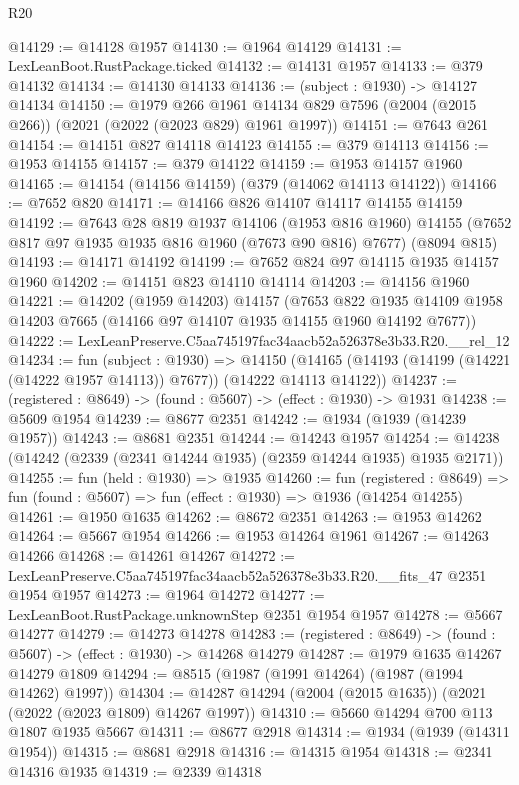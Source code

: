 \begin{lexlean}{R20}
\begin{coremodule}
@14129 := @14128 @1957
@14130 := @1964 @14129
@14131 := LexLeanBoot.RustPackage.ticked
@14132 := @14131 @1957
@14133 := @379 @14132
@14134 := @14130 @14133
@14136 := (subject : @1930) -> @14127 @14134
@14150 := @1979
    @266
    @1961
    @14134
    @829
    @7596
    (@2004 (@2015 @266))
    (@2021 (@2022 (@2023 @829) @1961 @1997))
@14151 := @7643 @261
@14154 := @14151 @827 @14118 @14123
@14155 := @379 @14113
@14156 := @1953 @14155
@14157 := @379 @14122
@14159 := @1953 @14157 @1960
@14165 := @14154 (@14156 @14159) (@379 (@14062 @14113 @14122))
@14166 := @7652 @820
@14171 := @14166 @826 @14107 @14117 @14155 @14159
@14192 := @7643
    @28
    @819
    @1937
    @14106
    (@1953 @816 @1960)
    @14155
    (@7652 @817 @97 @1935 @1935 @816 @1960 (@7673 @90 @816) @7677)
    (@8094 @815)
@14193 := @14171 @14192
@14199 := @7652 @824 @97 @14115 @1935 @14157 @1960
@14202 := @14151 @823 @14110 @14114
@14203 := @14156 @1960
@14221 := @14202
    (@1959 @14203)
    @14157
    (@7653 @822 @1935 @14109 @1958 @14203 @7665 (@14166 @97 @14107 @1935 @14155 @1960 @14192 @7677))
@14222 := LexLeanPreserve.C5aa745197fac34aacb52a526378e3b33.R20.__rel_12
@14234 := fun (subject : @1930) =>
  @14150 (@14165 (@14193 (@14199 (@14221 (@14222 @1957 @14113)) @7677)) (@14222 @14113 @14122))
@14237 := (registered : @8649) -> (found : @5607) -> (effect : @1930) -> @1931
@14238 := @5609 @1954
@14239 := @8677 @2351
@14242 := @1934 (@1939 (@14239 @1957))
@14243 := @8681 @2351
@14244 := @14243 @1957
@14254 := @14238 (@14242 (@2339 (@2341 @14244 @1935) (@2359 @14244 @1935) @1935 @2171))
@14255 := fun (held : @1930) => @1935
@14260 := fun (registered : @8649) =>
  fun (found : @5607) => fun (effect : @1930) => @1936 (@14254 @14255)
@14261 := @1950 @1635
@14262 := @8672 @2351
@14263 := @1953 @14262
@14264 := @5667 @1954
@14266 := @1953 @14264 @1961
@14267 := @14263 @14266
@14268 := @14261 @14267
@14272 := LexLeanPreserve.C5aa745197fac34aacb52a526378e3b33.R20.__fits_47 @2351 @1954 @1957
@14273 := @1964 @14272
@14277 := LexLeanBoot.RustPackage.unknownStep @2351 @1954 @1957
@14278 := @5667 @14277
@14279 := @14273 @14278
@14283 := (registered : @8649) -> (found : @5607) -> (effect : @1930) -> @14268 @14279
@14287 := @1979 @1635 @14267 @14279 @1809
@14294 := @8515 (@1987 (@1991 @14264) (@1987 (@1994 @14262) @1997))
@14304 := @14287 @14294 (@2004 (@2015 @1635)) (@2021 (@2022 (@2023 @1809) @14267 @1997))
@14310 := @5660 @14294 @700 @113 @1807 @1935 @5667
@14311 := @8677 @2918
@14314 := @1934 (@1939 (@14311 @1954))
@14315 := @8681 @2918
@14316 := @14315 @1954
@14318 := @2341 @14316 @1935
@14319 := @2339 @14318

\end{coremodule}
\end{lexlean}
